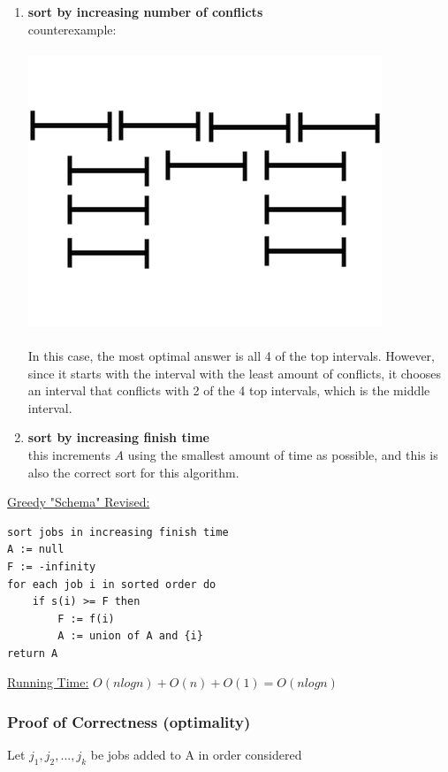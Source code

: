 \documentclass[12pt]{article}
\begin{document}
\begin{enumerate}
{	}
	\item{
	\textbf{sort by increasing number of conflicts}\\
	counterexample:\\
	\\
	\includegraphics{interval4}\\
	\\
	In this case, the most optimal answer is all 4 of the top intervals. However, since it starts with the interval with the least amount of conflicts, it chooses an interval that conflicts with 2 of the 4 top intervals, which is the middle interval.
	}
	\item{
	\textbf{sort by increasing finish time}\\
	this increments $A$ using the smallest amount of time as possible, and this is also the correct sort for this algorithm.
	\\
	}
\end{enumerate}

\underline{Greedy "Schema" Revised:}\\
\begin{lstlisting}
sort jobs in increasing finish time
A := null
F := -infinity
for each job i in sorted order do
	if s(i) >= F then
		F := f(i)
		A := union of A and {i}
return A
\end{lstlisting}

\underline{Running Time:} $O(nlogn) + O(n) + O(1) = O(nlogn)$

\subsubsection{Proof of Correctness (optimality)}

Let $j_1, j_2, ... , j_k$ be jobs added to A in order considered
\end{document}
